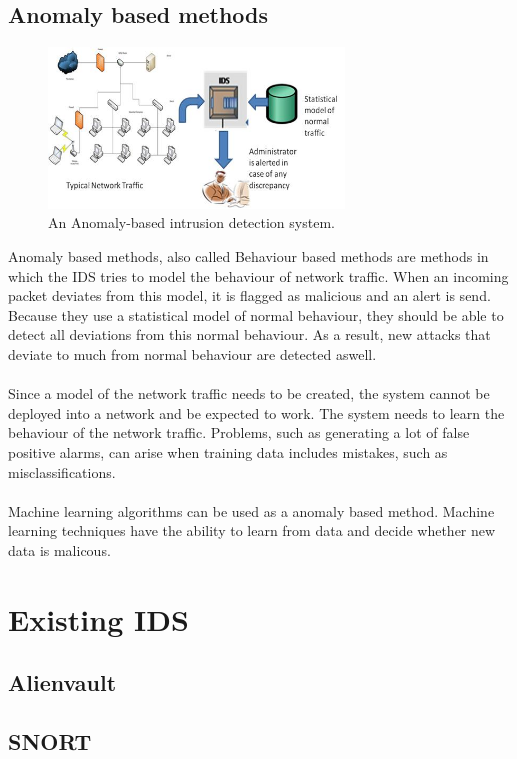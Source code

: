 \subsection{Anomaly based methods}
\begin{figure}[H]
\centering
\includegraphics[width=0.7\textwidth]{Figures/Anomaly-based-Intrusion-Detection-System}
\decoRule
\caption[Anomaly based IDS]{An Anomaly-based intrusion detection system.}
\label{fig:Anomaly}
\end{figure}
\noindent Anomaly based methods, also called Behaviour based methods are methods in which the IDS tries to model the behaviour of network traffic. When an incoming packet deviates from this model, it is flagged as malicious and an alert is send. Because they use a statistical model of normal behaviour, they should be able to detect all deviations from this normal behaviour. As a result, new attacks that deviate to much from normal behaviour are detected aswell. \\
\\
Since a model of the network traffic needs to be created, the system cannot be deployed into a network and be expected to work. The system needs to learn the behaviour of the network traffic. Problems, such as generating a lot of false positive alarms, can arise when training data includes mistakes, such as misclassifications. \\
\\
Machine learning algorithms can be used as a anomaly based method. Machine learning techniques have the ability to learn from data and decide whether new data is malicous. 

\section{Existing IDS}

\subsection{Alienvault}

\subsection{SNORT}

